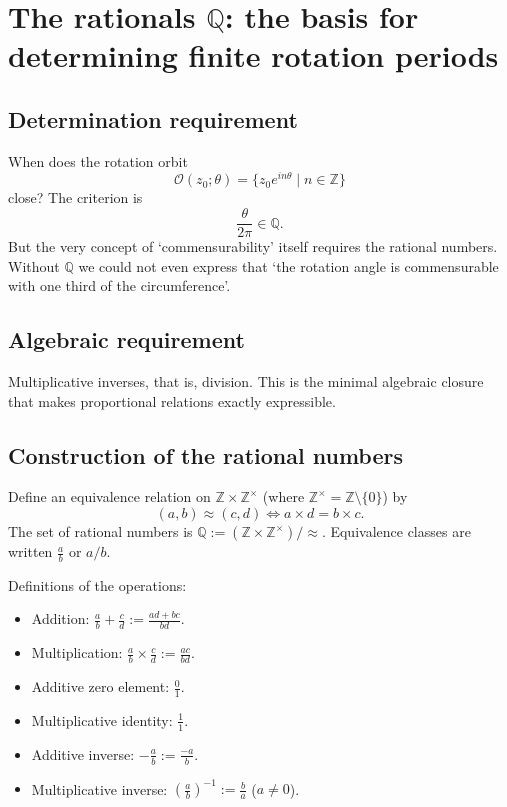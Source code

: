 \section{\texorpdfstring{The rationals $\mathbb{Q}$: the basis for determining finite rotation periods}{The rationals Q: the basis for determining finite rotation periods}}

\subsection{\texorpdfstring{Determination requirement}{Determination requirement}}

When does the rotation orbit
\[
\mathcal{O}(z_0; \theta) = \{z_0 e^{in\theta} \mid n\in\mathbb{Z}\}
\]
close? The criterion is
\[
\frac{\theta}{2\pi} \in \mathbb{Q}.
\]
But the very concept of `commensurability' itself requires the rational numbers. Without $\mathbb{Q}$ we could not even express that `the rotation angle is commensurable with one third of the circumference'.

\subsection{\texorpdfstring{Algebraic requirement}{Algebraic requirement}}

Multiplicative inverses, that is, division. This is the minimal algebraic closure that makes proportional relations exactly expressible.

\subsection{\texorpdfstring{Construction of the rational numbers}{Construction of the rational numbers}}

\begin{definition}\label{def:rational_construction}
Define an equivalence relation on $\mathbb{Z} \times \mathbb{Z}^{\times}$ (where $\mathbb{Z}^{\times} = \mathbb{Z} \setminus \{0\}$) by
\[
(a,b) \approx (c,d) \iff a \times d = b \times c.
\]
The set of rational numbers is $\mathbb{Q} := (\mathbb{Z} \times \mathbb{Z}^{\times}) / \approx$. Equivalence classes are written $\frac{a}{b}$ or $a/b$.

Definitions of the operations:
\begin{itemize}
    \item Addition: $\frac{a}{b} + \frac{c}{d} := \frac{ad+bc}{bd}$.
    \item Multiplication: $\frac{a}{b} \times \frac{c}{d} := \frac{ac}{bd}$.
    \item Additive zero element: $\frac{0}{1}$.
    \item Multiplicative identity: $\frac{1}{1}$.
    \item Additive inverse: $-\frac{a}{b} := \frac{-a}{b}$.
    \item Multiplicative inverse: $(\frac{a}{b})^{-1} := \frac{b}{a}$ ($a \neq 0$).
\end{itemize}
\end{definition}

